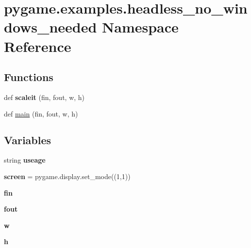 \hypertarget{namespacepygame_1_1examples_1_1headless__no__windows__needed}{}\section{pygame.\+examples.\+headless\+\_\+no\+\_\+windows\+\_\+needed Namespace Reference}
\label{namespacepygame_1_1examples_1_1headless__no__windows__needed}
\subsection*{Functions}
\begin{DoxyCompactItemize}
\item 
\mbox{\label{namespacepygame_1_1examples_1_1headless__no__windows__needed_a084d6f37ea85191fc125cb037aca68a7}} 
def {\bfseries scaleit} (fin, fout, w, h)
\item 
def \hyperlink{namespacepygame_1_1examples_1_1headless__no__windows__needed_a8c976583b5b94b1c6d860e0ddbd4b53c}{main} (fin, fout, w, h)
\end{DoxyCompactItemize}
\subsection*{Variables}
\begin{DoxyCompactItemize}
\item 
string {\bfseries useage}
\item 
\mbox{\label{namespacepygame_1_1examples_1_1headless__no__windows__needed_aa595e2af7ddda58843a28ca0708eb35f}} 
{\bfseries screen} = pygame.\+display.\+set\+\_\+mode((1,1))
\item 
\mbox{\label{namespacepygame_1_1examples_1_1headless__no__windows__needed_a2c45f545db3f2e6d7d4726b012ed9202}} 
{\bfseries fin}
\item 
\mbox{\label{namespacepygame_1_1examples_1_1headless__no__windows__needed_a09b64c178ba07095b2c1ff33d01221c8}} 
{\bfseries fout}
\item 
\mbox{\label{namespacepygame_1_1examples_1_1headless__no__windows__needed_abb09bf93e97183bb1e6e579435eaebcc}} 
{\bfseries w}
\item 
\mbox{\label{namespacepygame_1_1examples_1_1headless__no__windows__needed_a888cb9c26ca01a5432cc22201aa0b463}} 
{\bfseries h}
\end{DoxyCompactItemize}


